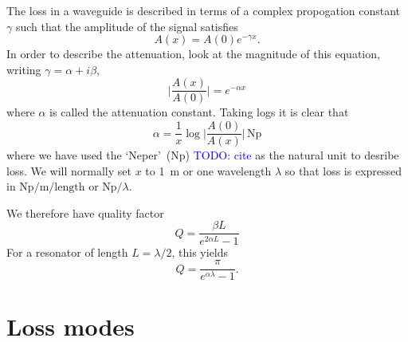 \documentclass[a4paper]{article}
\newcommand{\cm}[1]{\textcolor{blue}{#1}} %
\begin{document}
The loss in a waveguide is described in terms of a complex propogation
constant~\cite{Collin2007} $\gamma$ such that the amplitude of the signal
satisfies
\begin{equation}
  A(x) = A(0)e^{-\gamma x}.
\end{equation}
In order to describe the attenuation, look at the magnitude of this equation,
writing $\gamma = \alpha +i\beta$,
\begin{equation}
  \lvert\frac{A(x)}{A(0)}\rvert = e^{-\alpha x}
\end{equation}
where $\alpha$ is called the attenuation constant. Taking logs it is clear that
\begin{equation}
  \alpha = \frac{1}{x}\log\lvert\frac{A(0)}{A(x)}\rvert\,\si{\neper}
\end{equation}
where we have used the `Neper'~(\si{\neper}) \cm{TODO: cite} as the natural unit
to desribe loss. We will normally set $x$ to 
\SI{1}{\meter} or one wavelength $\lambda$ so that loss is expressed in
$\si{\neper \per \meter}/\mathrm{length}$ or $\si{\neper}/\lambda$.
%
%

We therefore have quality factor
\begin{equation}
  Q = \frac{\beta L}{e^{2\alpha L} -1}
\end{equation}
For a resonator of length $L = \lambda/2$, this yields
\begin{equation}
  Q = \frac{\pi}{e^{\alpha \lambda} - 1}.
\end{equation}


\section{Loss modes}
\end{document}
